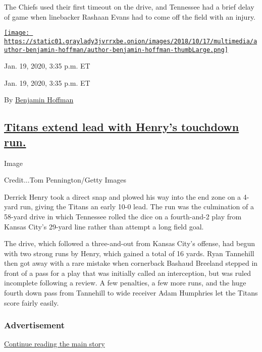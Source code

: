 The Chiefs used their first timeout on the drive, and Tennessee had a
brief delay of game when linebacker Rashaan Evans had to come off the
field with an injury.

\href{https://www.nytimes3xbfgragh.onion/by/benjamin-hoffman}{\texttt{[image: https://static01.graylady3jvrrxbe.onion/images/2018/10/17/multimedia/author-benjamin-hoffman/author-benjamin-hoffman-thumbLarge.png]}}

Jan. 19, 2020, 3:35 p.m. ET

Jan. 19, 2020, 3:35 p.m. ET

By
\href{https://www.nytimes3xbfgragh.onion/by/benjamin-hoffman}{Benjamin
Hoffman}

\hypertarget{titans-extend-lead-with-henrys-touchdown-run}{%
\subsection{\texorpdfstring{\protect\hyperlink{titans-extend-lead-with-henrys-touchdown-run}{Titans
extend lead with Henry's touchdown
run.}}{Titans extend lead with Henry's touchdown run.}}\label{titans-extend-lead-with-henrys-touchdown-run}}

Image

Credit...Tom Pennington/Getty Images

Derrick Henry took a direct snap and plowed his way into the end zone on
a 4-yard run, giving the Titans an early 10-0 lead. The run was the
culmination of a 58-yard drive in which Tennessee rolled the dice on a
fourth-and-2 play from Kansas City's 29-yard line rather than attempt a
long field goal.

The drive, which followed a three-and-out from Kansas City's offense,
had begun with two strong runs by Henry, which gained a total of 16
yards. Ryan Tannehill then got away with a rare mistake when cornerback
Bashaud Breeland stepped in front of a pass for a play that was
initially called an interception, but was ruled incomplete following a
review. A few penalties, a few more runs, and the huge fourth down pass
from Tannehill to wide receiver Adam Humphries let the Titans score
fairly easily.

\hypertarget{advertisement-5}{%
\subsubsection{Advertisement}\label{advertisement-5}}

\protect\hyperlink{after-dfp-ad-mid6}{Continue reading the main story}

